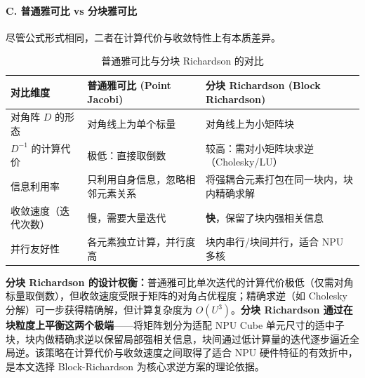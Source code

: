     \paragraph{C. 普通雅可比 vs 分块雅可比}

    尽管公式形式相同，二者在计算代价与收敛特性上有本质差异。

    \begin{table}[H]
        \centering
        \caption{普通雅可比与分块 Richardson 的对比}
        \begin{tabular}{p{3.2cm} p{5.5cm} p{5.5cm}}
            \toprule \textbf{对比维度} & \textbf{普通雅可比 (Point Jacobi)} & \textbf{分块 Richardson (Block Richardson)} \\
            \midrule 对角阵 $D$ 的形态   & 对角线上为单个标量                     & 对角线上为小矩阵块                                 \\
            $D^{-1}$ 的计算代价         & 极低：直接取倒数                      & 较高：需对小矩阵块求逆（Cholesky/LU）                  \\
            信息利用率                  & 只利用自身信息，忽略相邻元素关系              & 将强耦合元素打包在同一块内，块内精确求解                      \\
            收敛速度（迭代次数）             & 慢，需要大量迭代                      & \textbf{快}，保留了块内强相关信息                     \\
            并行友好性                  & 各元素独立计算，并行度高                  & 块内串行/块间并行，适合 NPU 多核                       \\
            \bottomrule
        \end{tabular}
    \end{table}

    \textbf{分块 Richardson 的设计权衡：}普通雅可比单次迭代的计算代价极低（仅需对角标量取倒数），但收敛速度受限于矩阵的对角占优程度；精确求逆（如
    Cholesky 分解）可一步获得精确解，但计算复杂度为 $O(U^{3})$。\textbf{分块
    Richardson 通过在块粒度上平衡这两个极端}——将矩阵划分为适配 NPU Cube
    单元尺寸的适中子块，块内做精确求逆以保留局部强相关信息，块间通过低计算量的迭代逐步逼近全局逆。该策略在计算代价与收敛速度之间取得了适合
    NPU 硬件特征的有效折中，是本文选择 Block-Richardson
    为核心求逆方案的理论依据。

